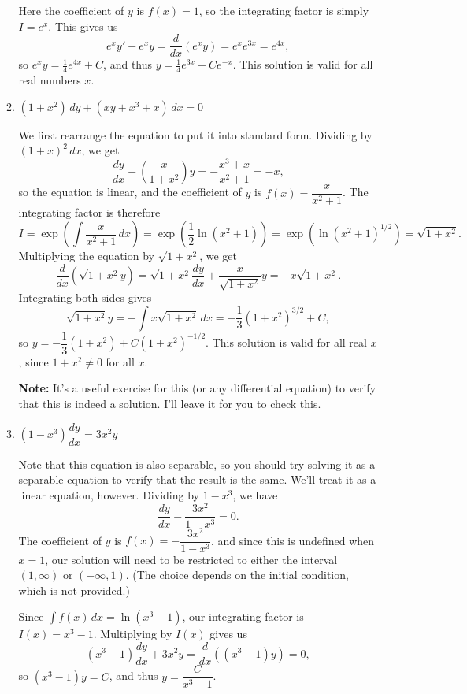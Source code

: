 \documentclass[12pt]{article}
\begin{document}
\begin{enumerate}
\begin{enumerate}
 \bigskip
 
 Here the coefficient of $y$ is $f(x)=1$, so the integrating factor is simply $I=e^x$. This gives us
 \[
 e^xy'+e^xy = \frac{d}{dx}(e^xy) = e^xe^{3x} = e^{4x},
 \]
 so $e^xy = \frac{1}{4}e^{4x}+C$, and thus $y = \frac{1}{4}e^{3x}+Ce^{-x}$. This solution is valid for all real numbers $x$.
 
 \item $(1+x^2)\,dy+(xy+x^3+x)\,dx = 0$
 
 \bigskip
 
 We first rearrange the equation to put it into standard form. Dividing by $(1+x)^2\,dx$, we get
 \[
 \frac{dy}{dx} + \left(\frac{x}{1+x^2}\right)y = -\frac{x^3+x}{x^2+1} = -x,
 \]
 so the equation is linear, and the coefficient of $y$ is $f(x) = \dfrac{x}{x^2+1}$. The integrating factor is therefore
 \[
 I = \exp\left(\int \frac{x}{x^2+1}\,dx \right) = \exp \left(\frac{1}{2}\ln(x^2+1)\right) = \exp(\ln(x^2+1)^{1/2}) = \sqrt{1+x^2}.
 \]
 Multiplying the equation by $\sqrt{1+x^2}$, we get
 \[
 \dfrac{d}{dx}(\sqrt{1+x^2}y) = \sqrt{1+x^2}\frac{dy}{dx}+\frac{x}{\sqrt{1+x^2}}y = -x\sqrt{1+x^2}.
 \]
 Integrating both sides gives
 \[
 \sqrt{1+x^2}y = -\int x\sqrt{1+x^2}\,dx = -\frac{1}{3}(1+x^2)^{3/2}+C,
 \]
 so $y = -\dfrac{1}{3}(1+x^2)+C(1+x^2)^{-1/2}$. This solution is valid for all real $x$, since $1+x^2\neq 0$ for all $x$.
 
 \textbf{Note:} It's a useful exercise for this (or any differential equation) to verify that this is indeed a solution. I'll leave it for you to check this.
 
 \item $(1-x^3)\dfrac{dy}{dx}=3x^2y$
 
 \bigskip
 
 Note that this equation is also separable, so you should try solving it as a separable equation to verify that the result is the same. We'll treat it as a linear equation, however. Dividing by $1-x^3$, we have
 \[
 \frac{dy}{dx}-\frac{3x^2}{1-x^3}=0.
 \]
 The coefficient of $y$ is $f(x) = -\dfrac{3x^2}{1-x^3}$, and since this is undefined when $x=1$, our solution will need to be restricted to either the interval $(1,\infty)$ or $(-\infty, 1)$. (The choice depends on the initial condition, which is not provided.)
 
 Since $\int f(x)\,dx = \ln(x^3-1)$, our integrating factor is $I(x) = x^3-1$. Multiplying by $I(x)$ gives us 
 \[
 (x^3-1)\frac{dy}{dx} +3x^2y = \frac{d}{dx}((x^3-1)y) = 0,
 \]
 so $(x^3-1)y=C$, and thus $y = \dfrac{C}{x^3-1}$.
 

\end{enumerate}
\end{enumerate}
\end{document}
